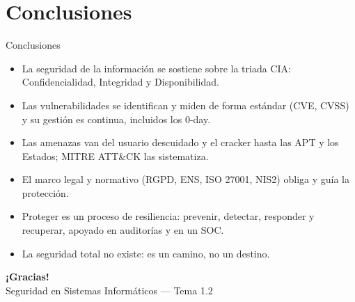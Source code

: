 \documentclass[aspectratio=169,11pt]{beamer}
\begin{document}
\section{Conclusiones}

\begin{frame}[allowframebreaks]{Conclusiones}
\small
  \begin{itemize}
  \item La seguridad de la información se sostiene sobre la triada CIA: Confidencialidad, Integridad y Disponibilidad.
  \item Las vulnerabilidades se identifican y miden de forma estándar (CVE, CVSS) y su gestión es continua, incluidos los 0-day.
  \item Las amenazas van del usuario descuidado y el cracker hasta las APT y los Estados; MITRE ATT\&CK las sistematiza.
  \item El marco legal y normativo (RGPD, ENS, ISO 27001, NIS2) obliga y guía la protección.
  \item Proteger es un proceso de resiliencia: prevenir, detectar, responder y recuperar, apoyado en auditorías y en un SOC.
  \item La seguridad total no existe: es un camino, no un destino.
  \end{itemize}
\end{frame}

\begin{frame}[plain]
  \begin{center}
    {\Huge\bfseries\color{uznavy} ¡Gracias!}\\[1em]
    {\large Seguridad en Sistemas Informáticos --- Tema 1.2}
  \end{center}
\end{frame}
\end{document}
